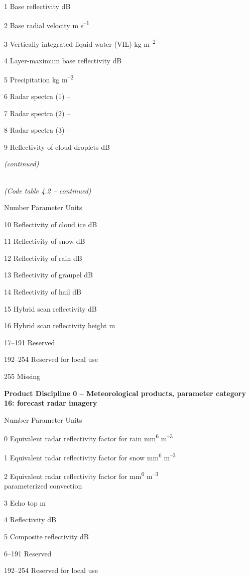 1 Base reflectivity dB

2 Base radial velocity m s\textsuperscript{--1}

3 Vertically integrated liquid water (VIL) kg m\textsuperscript{--2}

4 Layer-maximum base reflectivity dB

5 Precipitation kg m\textsuperscript{--2}

6 Radar spectra (1) --

7 Radar spectra (2) --

8 Radar spectra (3) --

9 Reflectivity of cloud droplets dB

\emph{(continued)}

\emph{\\
(Code table 4.2 -- continued)}

Number Parameter Units

10 Reflectivity of cloud ice dB

11 Reflectivity of snow dB

12 Reflectivity of rain dB

13 Reflectivity of graupel dB

14 Reflectivity of hail dB

15 Hybrid scan reflectivity dB

16 Hybrid scan reflectivity height m

17--191 Reserved

192--254 Reserved for local use

255 Missing

\textbf{Product Discipline 0 -- Meteorological products, parameter category 16: forecast radar imagery}

Number Parameter Units

0 Equivalent radar reflectivity factor for rain mm\textsuperscript{6} m\textsuperscript{--3}

1 Equivalent radar reflectivity factor for snow mm\textsuperscript{6} m\textsuperscript{--3}

2 Equivalent radar reflectivity factor for mm\textsuperscript{6} m\textsuperscript{--3}\\
parameterized convection

3 Echo top m

4 Reflectivity dB

5 Composite reflectivity dB

6--191 Reserved

192--254 Reserved for local use

